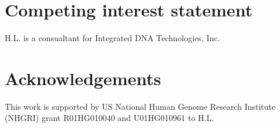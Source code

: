 \documentclass{bioinfo}
\begin{document}
\section{Competing interest statement}

H.L. is a consualtant for Integrated DNA Technologies, Inc.

\section{Acknowledgements}

This work is supported by US National Human Genome Research Institute (NHGRI)
grant R01HG010040 and U01HG010961 to H.L.


\end{document}
